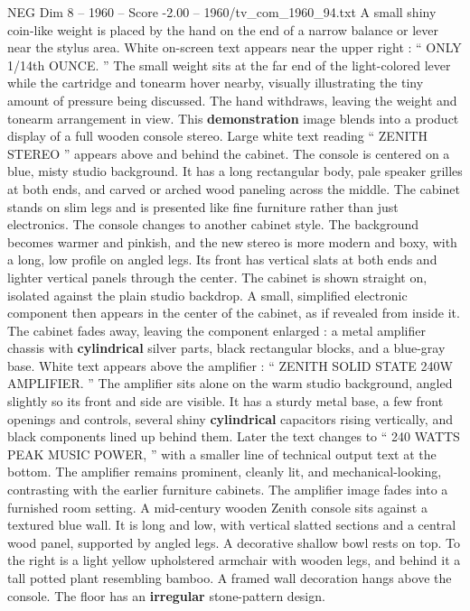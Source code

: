 \begin{textsample}{NEG Dim 8 – 1960 – Score -2.00 – 1960/tv\_com\_1960\_94.txt}
A small shiny coin-like weight is placed by the hand on the end of a narrow balance or lever near the stylus area.
White on-screen text appears near the upper right : “ ONLY 1/14th OUNCE. ” The small weight sits at the far end of the light-colored lever while the cartridge and tonearm hover nearby, visually illustrating the tiny amount of pressure being discussed.
The hand withdraws, leaving the weight and tonearm arrangement in view.
This \textbf{demonstration} image blends into a product display of a full wooden console stereo.
Large white text reading “ ZENITH STEREO ” appears above and behind the cabinet.
The console is centered on a blue, misty studio background.
It has a long rectangular body, pale speaker grilles at both ends, and carved or arched wood paneling across the middle.
The cabinet stands on slim legs and is presented like fine furniture rather than just electronics.
The console changes to another cabinet style.
The background becomes warmer and pinkish, and the new stereo is more modern and boxy, with a long, low profile on angled legs.
Its front has vertical slats at both ends and lighter vertical panels through the center.
The cabinet is shown straight on, isolated against the plain studio backdrop.
A small, simplified electronic component then appears in the center of the cabinet, as if revealed from inside it.
The cabinet fades away, leaving the component enlarged : a metal amplifier chassis with \textbf{cylindrical} silver parts, black rectangular blocks, and a blue-gray base.
White text appears above the amplifier : “ ZENITH SOLID STATE 240W AMPLIFIER. ” The amplifier sits alone on the warm studio background, angled slightly so its front and side are visible.
It has a sturdy metal base, a few front openings and controls, several shiny \textbf{cylindrical} capacitors rising vertically, and black components lined up behind them.
Later the text changes to “ 240 WATTS PEAK MUSIC POWER, ” with a smaller line of technical output text at the bottom.
The amplifier remains prominent, cleanly lit, and mechanical-looking, contrasting with the earlier furniture cabinets.
The amplifier image fades into a furnished room setting.
A mid-century wooden Zenith console sits against a textured blue wall.
It is long and low, with vertical slatted sections and a central wood panel, supported by angled legs.
A decorative shallow bowl rests on top.
To the right is a light yellow upholstered armchair with wooden legs, and behind it a tall potted plant resembling bamboo.
A framed wall decoration hangs above the console.
The floor has an \textbf{irregular} stone-pattern design.

\end{textsample}

